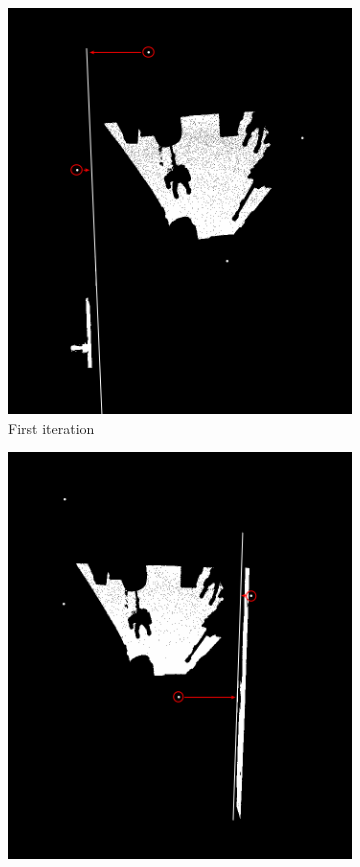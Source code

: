 			\begin{figure}[H] 
				\begin{subfigure}[b]{0.5\linewidth}
					\centering
					\includegraphics[width=0.9\linewidth]{"Includes/images/Project Points/F-1"} 
					\caption{First iteration} 
					\label{fig4Adjust:a} 
					\vspace{4ex}
				\end{subfigure}%
				\begin{subfigure}[b]{0.5\linewidth}
					\centering
					\includegraphics[width=0.9\linewidth]{"Includes/images/Project Points/F-2"} 

\end{subfigure}
\end{figure}
